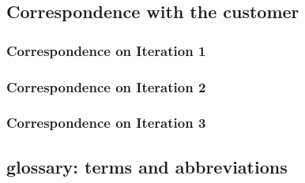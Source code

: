 


\subsection{Correspondence with the customer}
\begin{small}
% 
\end{small}

\subsubsection{Correspondence on Iteration 1}
\begin{small}
% 
\end{small}

\subsubsection{Correspondence on Iteration 2}
\begin{small}
% 
\end{small}

\subsubsection{Correspondence on Iteration 3}
% 

\subsection{glossary: terms and abbreviations}